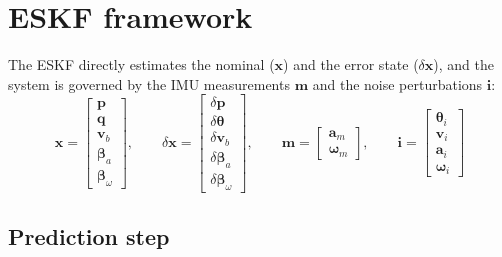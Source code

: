 \section{ESKF framework}

The ESKF directly estimates the nominal ($\mathbf{x}$) and the error state ($\delta\mathbf{x}$), and the system is governed by the IMU measurements $\mathbf{m}$ and the noise perturbations $\mathbf{i}$:
\begin{equation}
    \mathbf{x}=\begin{bmatrix}
    \mathbf{p} \\
    \mathbf{q} \\
    \mathbf{v}_{b} \\
    \boldsymbol{\beta}_{a} \\
    \boldsymbol{\beta}_{\omega}
    \end{bmatrix}, \qquad
    \delta\mathbf{x}=\begin{bmatrix}
    \delta\mathbf{p} \\
    \delta\boldsymbol{\theta} \\
    \delta\mathbf{v}_{b} \\
    \delta\boldsymbol{\beta}_{a} \\
    \delta\boldsymbol{\beta}_{\omega}
    \end{bmatrix}, \qquad
    \mathbf{m}=\begin{bmatrix}
        \mathbf{a}_{m} \\
        \boldsymbol{\omega}_{m}
    \end{bmatrix}, \qquad
    \mathbf{i}=\begin{bmatrix}
        \boldsymbol{\theta}_i \\
        \mathbf{v}_i \\
        \mathbf{a}_i \\
        \boldsymbol{\omega}_i
    \end{bmatrix}
\end{equation}

\subsection{Prediction step}

